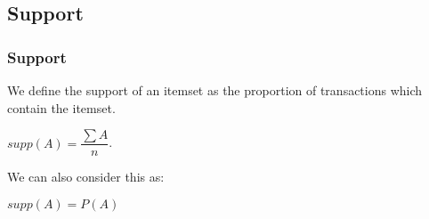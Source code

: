 
\subsection{Support}

\subsubsection{Support}

We define the support of an itemset as the proportion of transactions which contain the itemset.

\(supp(A)=\dfrac{\sum A }{n}\).

We can also consider this as:

\(supp(A)=P(A)\)
	

